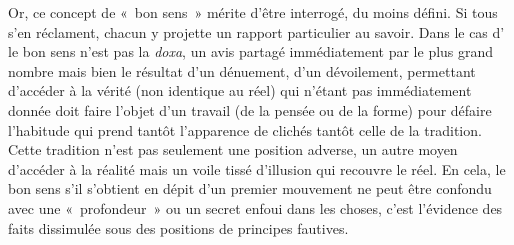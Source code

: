 \documentclass[12pt, a4paper]{article}
\begin{document}
Or, ce concept de «~bon sens~» mérite d'être interrogé, du moins défini. Si tous s'en réclament, chacun y projette un rapport particulier au savoir. Dans le cas d'\robbe{} le bon sens n'est pas la \textit{doxa}, un avis partagé immédiatement par le plus grand nombre mais bien le résultat d'un dénuement, d'un dévoilement, permettant d'accéder à la vérité (non identique au réel) qui n'étant pas immédiatement donnée doit faire l'objet d'un travail (de la pensée ou de la forme) pour défaire l'habitude qui prend tantôt l'apparence de clichés tantôt celle de la tradition. Cette tradition n'est pas seulement une position adverse, un autre moyen d'accéder à la réalité mais un voile tissé d'illusion qui recouvre le réel. En cela, le bon sens s'il s'obtient en dépit d'un premier mouvement ne peut être confondu avec une «~profondeur~» ou un secret enfoui dans les choses, c'est l'évidence des faits dissimulée sous des positions de principes fautives. 
\end{document}
